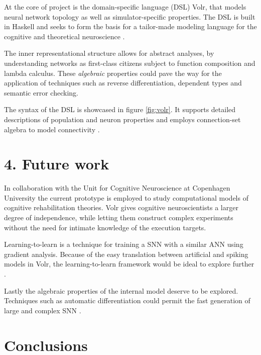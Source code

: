 \documentclass[a0,portrait]{a0poster}
\begin{document}
\begin{multicols}{2}
\noindent At the core of project is the domain-specific language (DSL) Volr, that models neural network 
topology as well as simulator-specific properties. 
The DSL is built in Haskell and seeks to form the basis for a tailor-made modeling language 
for the cognitive and theoretical neuroscience \cite{Innes2017}.

The inner representational structure allows for abstract analyses, by understanding networks
as first-class citizens subject to function composition and lambda calculus.
These \textit{algebraic} properties could pave the way for the application of techniques
such as reverse differentiation, dependent types and semantic error checking.

The syntax of the DSL is showcased in figure \ref{fig:volr}.
It supports detailed descriptions of population and neuron properties and employs
connection-set algebra to model connectivity \cite{Djurfeldt2012}.

\section*{4. Future work}
In collaboration with the Unit for Cognitive Neuroscience at Copenhagen University the 
current prototype is employed to study computational models of cognitive rehabilitation 
theories.
Volr gives cognitive neuroscientists a larger degree of independence, while letting them
construct complex experiments without the need for intimate knowledge of the execution 
targets.

Learning-to-learn is a technique for training a SNN with a similar ANN using gradient
analysis. Because of the easy translation between artificial and spiking models in Volr, the
learning-to-learn framework would be ideal to explore further \cite{Bellec2018}.

Lastly the algebraic properties of the internal model deserve to be explored. Techniques
such as automatic differentiation could permit the fast generation of large and complex
SNN \cite{Baydin2018}.


\color{SaddleBrown} %

\section*{Conclusions}


\end{multicols}
\end{document}
